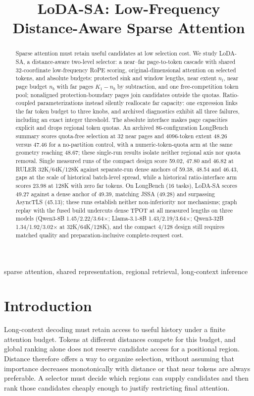 \documentclass[conference,9pt,letterpaper]{IEEEtran}
\title{LoDA-SA: Low-Frequency Distance-Aware Sparse Attention}
\author{\IEEEauthorblockN{Anonymous authors}}
\begin{document}
\maketitle
\begin{abstract}
Sparse attention must retain useful candidates at low selection cost. We study LoDA-SA, a distance-aware two-level selector: a near--far page-to-token cascade with shared 32-coordinate low-frequency RoPE scoring, original-dimensional attention on selected tokens, and absolute budgets: protected sink and window lengths, near extent $n_l$, near page budget $n_b$ with far pages $K_1-n_b$ by subtraction, and one free-competition token pool; nonaligned protection-boundary pages join candidates outside the quotas. Ratio-coupled parameterizations instead silently reallocate far capacity: one expression links the far token budget to three knobs, and archived diagnostics exhibit all three failures, including an exact integer threshold. The absolute interface makes page capacities explicit and drops regional token quotas. An archived 86-configuration LongBench summary scores quota-free selection at 32 near pages and 4096-token extent 48.26 versus 47.46 for a no-partition control, with a numeric-token-quota arm at the same geometry reaching 48.67; these single-run results isolate neither regional axis nor quota removal. Single measured runs of the compact design score 59.02, 47.80 and 46.82 at RULER 32K/64K/128K against separate-run dense anchors of 59.38, 48.54 and 46.43, gaps at the scale of historical batch-level spread, while a historical ratio-interface arm scores 23.98 at 128K with zero far tokens. On LongBench (16 tasks), LoDA-SA scores 49.27 against a dense anchor of 49.39, matching JSSA (49.28) and surpassing AsyncTLS (45.13); these runs establish neither non-inferiority nor mechanisms; graph replay with the fused build undercuts dense TPOT at all measured lengths on three models (Qwen3-8B 1.45/2.22/3.64$\times$; Llama-3.1-8B 1.43/2.19/3.64$\times$; Qwen3-32B 1.34/1.92/3.02$\times$ at 32K/64K/128K), and the compact 4/128 design still requires matched quality and preparation-inclusive complete-request cost.

\end{abstract}
\begin{IEEEkeywords}
sparse attention, shared representation, regional retrieval, long-context inference
\end{IEEEkeywords}

\section{Introduction}
Long-context decoding must retain access to useful history under a finite attention budget. Tokens at different distances compete for this budget, and global ranking alone does not reserve candidate access for a positional region. Distance therefore offers a way to organize selection, without assuming that importance decreases monotonically with distance or that near tokens are always preferable. A selector must decide which regions can supply candidates and then rank those candidates cheaply enough to justify restricting final attention.
\end{document}
